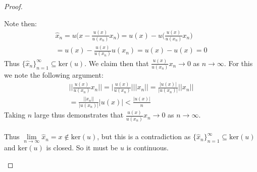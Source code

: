 \documentclass[12pt]{article}
\newcommand{\Biggnorm}{\Bigg | \Bigg |}
\newenvironment{ex}[2][Exercise]{\begin{trivlist}
\item[\hskip \labelsep {\bfseries #1}\hskip \labelsep {\bfseries #2.}]}{\end{trivlist}}
\begin{document}
\begin{ex}{2}
\begin{enumerate}[label=(\alph*)]
\begin{proof}
\begin{enumerate}[label=(\arabic*)]
\begin{equation}
                \end{equation}
                Note then: 
                \begin{equation}
                    \begin{aligned}
                    \hat{x}_n = u \Bigg (x - \frac{u(x)}{u(x_n)}x_n \Bigg ) = u(x) - u \Bigg ( \frac{u(x)}{u(x_n)}x_n \Bigg ) \\
                    = u(x) - \frac{u(x)}{u(x_n)}u(x_n) = u(x) - u(x) = 0
                    \end{aligned}
                \end{equation}
                Thus $\{\hat{x}_n\}_{n = 1}^\infty \subseteq \text{ker}(u)$. We claim then that $\frac{u(x)}{u(x_n)}x_n \rightarrow 0$ as $n \rightarrow \infty$. For this we note the following argument:
                \begin{equation}
                    \begin{aligned}
                        \Biggnorm \frac{u(x)}{u(x_n)}x_n \Biggnorm = \Bigg | \frac{u(x)}{u(x_n)} \Bigg | ||x_n|| = \frac{|u(x)|}{|u(x_n)|} ||x_n|| \\
                        = \frac{||x_n||}{|u(x_n)|}|u(x)| < \frac{|u(x)|}{n}
                    \end{aligned}
                \end{equation}
                Taking $n$ large thus demonstrates that $\frac{u(x)}{u(x_n)}x_n \rightarrow 0$ as $n \rightarrow \infty$. \\ \\ Thus $\underset{n \rightarrow \infty}{\lim} \hat{x}_n = x \notin \text{ker}(u)$, but this is a contradiction as $\{\hat{x}_n\}_{n = 1}^\infty \subseteq \text{ker}(u)$ and $\text{ker}(u)$ is closed. So it must be $u$ is continuous.
            \end{enumerate}
        \end{proof}
    \end{enumerate}
\end{ex}
\end{document}
